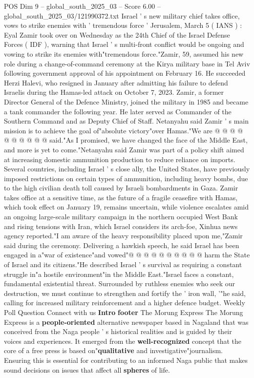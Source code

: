 \begin{textsample}{POS Dim 9 – global\_south\_2025\_03 – Score 6.00 – global\_south\_2025\_03/121990372.txt}  \label{ex:f9_pos_132}
Israel ' s new military chief takes office, vows to strike enemies with ' tremendous force ' Jerusalem, March 5 ( IANS ) : Eyal Zamir took over on Wednesday as the 24th Chief of the Israel Defense Forces ( IDF ), warning that Israel ' s multi-front conflict would be ongoing and vowing to strike its enemies with"tremendous force."Zamir, 59, assumed his new role during a change-of-command ceremony at the Kirya military base in Tel Aviv following government approval of his appointment on February 16.
He succeeded Herzi Halevi, who resigned in January after admitting his failure to defend Israelis during the Hamas-led attack on October 7, 2023.
Zamir, a former Director General of the Defence Ministry, joined the military in 1985 and became a tank commander the following year.
He later served as Commander of the Southern Command and as Deputy Chief of Staff.
Netanyahu said Zamir ' s main mission is to achieve the goal of"absolute victory"over Hamas."We are @ @ @ @ @ @ @ @ @ @ said."As I promised, we have changed the face of the Middle East, and more is yet to come."Netanyahu said Zamir was part of a policy shift aimed at increasing domestic ammunition production to reduce reliance on imports.
Several countries, including Israel ' s close ally, the United States, have previously imposed restrictions on certain types of ammunition, including heavy bombs, due to the high civilian death toll caused by Israeli bombardments in Gaza.
Zamir takes office at a sensitive time, as the future of a fragile ceasefire with Hamas, which took effect on January 19, remains uncertain, while violence escalates amid an ongoing large-scale military campaign in the northern occupied West Bank and rising tensions with Iran, which Israel considers its arch-foe, Xinhua news agency reported."I am aware of the heavy responsibility placed upon me,"Zamir said during the ceremony.
Delivering a hawkish speech, he said Israel has been engaged in a"war of existence"and vowed"@ @ @ @ @ @ @ @ @ @ harm the State of Israel and its citizens."He described Israel ' s survival as requiring a constant struggle in"a hostile environment"in the Middle East."Israel faces a constant, fundamental existential threat.
Surrounded by ruthless enemies who seek our destruction, we must continue to strengthen and fortify the ' iron wall, '"he said, calling for increased military reinforcement and a higher defence budget.
Weekly Poll Question Connect with us \textbf{Intro} \textbf{footer} The Morung Express The Morung Express is a \textbf{people-oriented} alternative newspaper based in Nagaland that was conceived from the Naga people ' s historical realities and is guided by their voices and experiences.
It emerged from the \textbf{well-recognized} concept that the core of a free press is based on"\textbf{qualitative} and investigative"journalism.
Ensuring this is essential for contributing to an informed Naga public that makes sound decisions on issues that affect all \textbf{spheres} of life.

\end{textsample}
